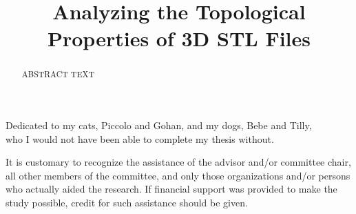 \documentclass[ma]{uncgdissertationexp2}
\title{Analyzing the Topological Properties of 3D STL Files}
\theoremstyle{plain}
\theoremstyle{definition}
\theoremstyle{remark}
\begin{document}
\frontmatter      %

\begin{abstract}
ABSTRACT TEXT 
\end{abstract}

\maketitlepage  

\makecopyrightpage

\begin{dedication}
 Dedicated to my cats, Piccolo and Gohan, and my dogs, Bebe and Tilly,\\
 who I would not have been able to complete my thesis without.
\end{dedication}

\makeapprovalpage

\begin{acknowledgments}
It is customary to recognize the assistance of the advisor and/or
committee chair, all other members of the committee, and only those
organizations and/or persons who actually aided the research. If
financial support was provided to make the study possible, credit for
such assistance should be given.
\end{acknowledgments}
\end{document}
